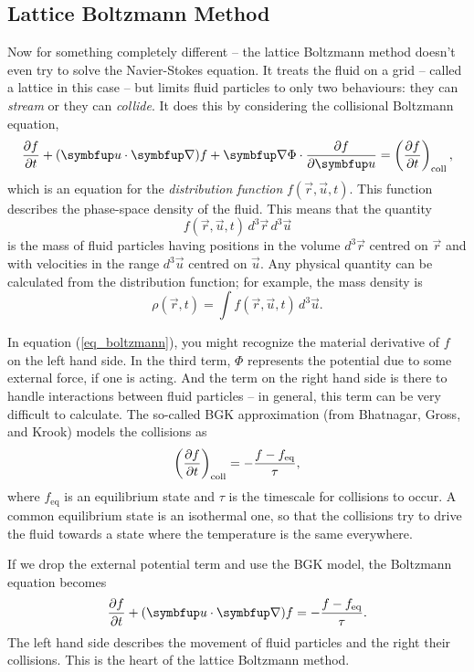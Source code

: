 \subsection{Lattice Boltzmann Method}

Now for something completely different -- the lattice Boltzmann method doesn't even try to solve the Navier-Stokes equation.  It treats the fluid on a grid -- called a lattice in this case -- but limits fluid particles to only two behaviours: they can \emph{stream} or they can \emph{collide}.  It does this by considering the collisional Boltzmann equation,
\begin{equation}
\label{eq_boltzmann}
\dfdx{f}{t} + (\vec{u} \cdot \grad) f + \grad \Phi \cdot \dfdx{f}{\vec{u}} = \left( \dfdx{f}{t} \right)_\text{coll},
\end{equation}
which is an equation for the \emph{distribution function} $f(\vec{r}, \vec{u}, t)$.  This function describes the phase-space density of the fluid.  This means that the quantity 
\[
f(\vec{r}, \vec{u}, t) \, d^3\vec{r} \, d^3\vec{u}
\]
is the mass of fluid particles having positions in the volume $d^3\vec{r}$ centred on $\vec{r}$ and with velocities in the range $d^3\vec{u}$ centred on $\vec{u}$.  Any physical quantity can be calculated from the distribution function; for example, the mass density is 
\[
\rho(\vec{r}, t) = \int f(\vec{r}, \vec{u}, t) \, d^3\vec{u}.
\]

In equation (\ref{eq_boltzmann}), you might recognize the material derivative of $f$ on the left hand side.  In the third term, $\Phi$ represents the potential due to some external force, if one is acting.  And the term on the right hand side is there to handle interactions between fluid particles -- in general, this term can be very difficult to calculate.  The so-called BGK approximation (from Bhatnagar, Gross, and Krook) models the collisions as
\[
\left( \frac{\partial {f}}{\partial {t}} \right)_\text{coll} = -\frac{f - f_\text{eq}}{\tau},
\]
where $f_\text{eq}$ is an equilibrium state and $\tau$ is the timescale for collisions to occur.  A common equilibrium state is an isothermal one, so that the collisions try to drive the fluid towards a state where the temperature is the same everywhere.

If we drop the external potential term and use the BGK model, the Boltzmann equation becomes
\[
\dfdx{f}{t} + (\vec{u} \cdot \grad) f = -\frac{f - f_\text{eq}}{\tau}.
\]
The left hand side describes the movement of fluid particles and the right their collisions.  This is the heart of the lattice Boltzmann method.

